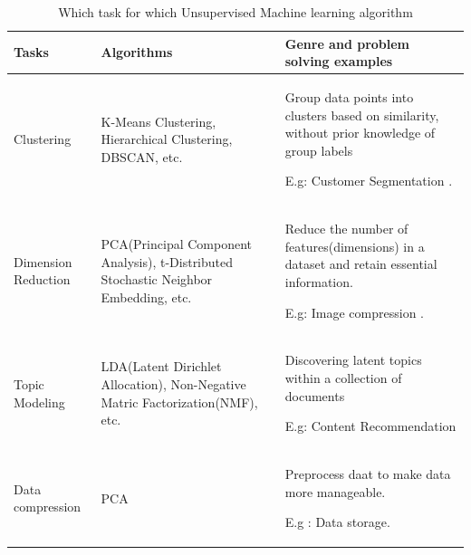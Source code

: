\documentclass[12pt,a4paper]{report}
\begin{document}
\renewcommand{\arraystretch}{1.2}
\begin{table}[h]
	\begin{tabular}{p{3cm}p{5.6cm}p{6cm}} 
		
		\toprule 
		Tasks & Algorithms & Genre and problem solving examples    \\
		\toprule
		Clustering & K-Means Clustering, Hierarchical Clustering, DBSCAN, etc. & Group data points into clusters based on similarity, without prior knowledge of group labels
		
		E.g: Customer Segmentation . \\
		
		Dimension Reduction & PCA(Principal Component Analysis), t-Distributed Stochastic Neighbor Embedding, etc. & Reduce the number of features(dimensions) in a dataset and retain essential information.
		
		E.g: Image compression .\\
		Topic Modeling & LDA(Latent Dirichlet Allocation), Non-Negative Matric Factorization(NMF), etc. & Discovering latent topics within a collection of documents
		
		E.g: Content Recommendation \\
		
		Data compression & PCA & Preprocess daat to make data more manageable.
		
		E.g : Data storage.\\
						
		\bottomrule
	\end{tabular} 
	\caption{Which task for which Unsupervised Machine learning algorithm} 
	\label{whichTaskWhichModelUnsupervised} 
\end{table} 


















\newpage


	
\newpage	
	
	
	
	
	
	
	
\end{document}
